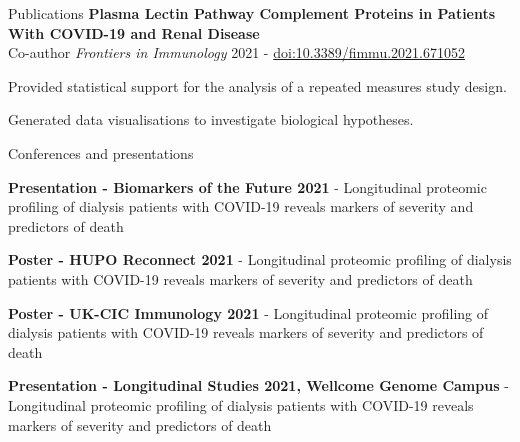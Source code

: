 \documentclass{resume}
\begin{document}
\begin{rSection}{Publications}
\textbf{Plasma Lectin Pathway Complement Proteins in Patients With COVID-19 and Renal Disease} \\
Co-author \hfill  \textit{Frontiers in Immunology} 2021 - \href{https://doi.org/10.3389/fimmu.2021.671052}{doi:10.3389/fimmu.2021.671052}

\vspace{2pt plus 1pt minus 1pt}
\item Provided statistical support for the analysis of a repeated measures study design.
\item Generated data visualisations to investigate biological hypotheses. \\

\end{rSection}

\begin{rSection}{Conferences and presentations}

\item \textbf{Presentation - Biomarkers of the Future 2021} - Longitudinal proteomic profiling of dialysis patients with COVID-19 reveals markers of severity and predictors of death
\vspace{2pt plus 1pt minus 1pt}

\item \textbf{Poster - HUPO Reconnect 2021} - Longitudinal proteomic profiling of dialysis patients with COVID-19 reveals markers of severity and predictors of death
\vspace{2pt plus 1pt minus 1pt}

\item \textbf{Poster - UK-CIC Immunology 2021} - Longitudinal proteomic profiling of dialysis patients with COVID-19 reveals markers of severity and predictors of death
\vspace{2pt plus 1pt minus 1pt}

\item \textbf{Presentation - Longitudinal Studies 2021, Wellcome Genome Campus} - Longitudinal proteomic profiling of dialysis patients with COVID-19 reveals markers of severity and predictors of death
\vspace{2pt plus 1pt minus 1pt}

\end{rSection}
\end{document}

